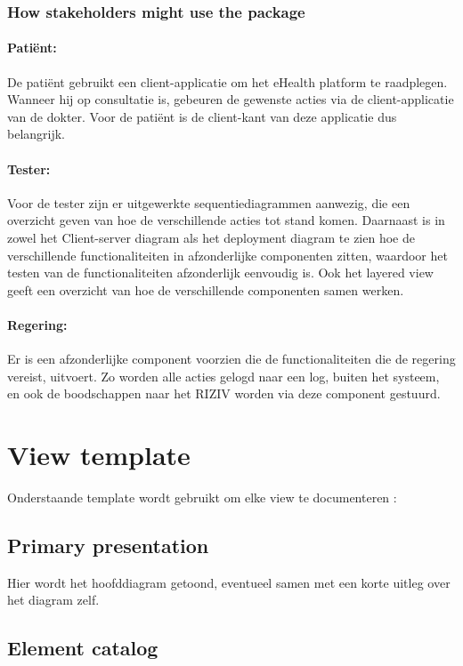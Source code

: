 \documentclass[a4paper,10pt]{article}
\begin{document}
\subsubsection{How stakeholders might use the package}

\paragraph{Patiënt:}
De patiënt gebruikt een client-applicatie om het eHealth platform te raadplegen. Wanneer hij op consultatie is, gebeuren de gewenste acties via de client-applicatie van de dokter. Voor de patiënt is de client-kant van deze applicatie dus belangrijk.

\paragraph{Tester:}
Voor de tester zijn er uitgewerkte sequentiediagrammen aanwezig, die een overzicht geven van hoe de verschillende acties tot stand komen. Daarnaast is in zowel het Client-server diagram als het deployment diagram te zien hoe de verschillende functionaliteiten in afzonderlijke componenten zitten, waardoor het testen van de functionaliteiten afzonderlijk eenvoudig is. Ook het layered view geeft een overzicht van hoe de verschillende componenten samen werken.

\paragraph{Regering:}
Er is een afzonderlijke component voorzien die de functionaliteiten die de regering vereist, uitvoert. Zo worden alle acties gelogd naar een log, buiten het systeem, en ook de boodschappen naar het RIZIV worden via deze component gestuurd. 

\section{View template}

Onderstaande template wordt gebruikt om elke view te documenteren : 
\subsection{Primary presentation}
Hier wordt het hoofddiagram getoond, eventueel samen met een korte uitleg over het diagram zelf.
\subsection{Element catalog}
\end{document}
